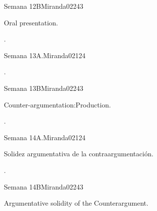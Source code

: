 \begin{syllabus}
\begin{unit}{Semana 12B}{}{Miranda02}{24}{3}
   \begin{topics}
      \item Oral presentation.
   \end{topics}

   \begin{learningoutcomes}
      \item .
      \end{learningoutcomes}
\end{unit}

\begin{unit}{Semana 13A.}{}{Miranda02}{12}{4}
   \begin{topics}
      \item .
   \end{topics}
   \begin{learningoutcomes}
      \item 
   \end{learningoutcomes}
\end{unit}

\begin{unit}{Semana 13B}{}{Miranda02}{24}{3}
   \begin{topics}
      \item Counter-argumentation:Production.
   \end{topics}

   \begin{learningoutcomes}
      \item . 
      \end{learningoutcomes}
\end{unit}

\begin{unit}{Semana 14A.}{}{Miranda02}{12}{4}
   \begin{topics}
      \item Solidez argumentativa de la contraargumentación. 
   \end{topics}
   \begin{learningoutcomes}
      \item .
   \end{learningoutcomes}
\end{unit}

\begin{unit}{Semana 14B}{}{Miranda02}{24}{3}
   \begin{topics}
      \item Argumentative solidity of the Counterargument.
   \end{topics}


\end{unit}
\end{syllabus}
